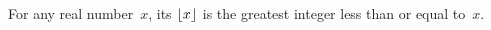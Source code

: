 \documentclass{test}  %
\begin{document}
\begin{problem}
\end{problem}

\begin{df}
For any real number~$x$,
its  $\lfloor x \rfloor$ is
the greatest integer less than or equal to~$x$.  
\end{df}
\end{document}
